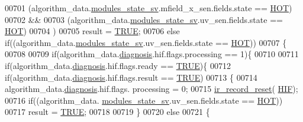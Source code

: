 \begin{DoxyCode}
{{{{{00701                         (algorithm\_data.\hyperlink{a00016_a293140e240bbd54f7601adbc9194148c}{modules\_state\_sv}.mfield\_x\_sen.fields.state == 
      \hyperlink{a00021_a1eb14cc432874ddacd1934791dbe12a3}{HOT})
00702                         &&
00703                         (algorithm\_data.\hyperlink{a00016_a293140e240bbd54f7601adbc9194148c}{modules\_state\_sv}.uv\_sen.fields.state == 
      \hyperlink{a00021_a1eb14cc432874ddacd1934791dbe12a3}{HOT})
00704                         )
00705                             result = \hyperlink{a00040_aa8cecfc5c5c054d2875c03e77b7be15d}{TRUE};
00706                        \textcolor{keywordflow}{else} \textcolor{keywordflow}{if}((algorithm\_data.\hyperlink{a00016_a293140e240bbd54f7601adbc9194148c}{modules\_state\_sv}.uv\_sen.fields.state == 
      \hyperlink{a00021_a1eb14cc432874ddacd1934791dbe12a3}{HOT}))
00707                        \{
00708 
00709                                        \textcolor{keywordflow}{if}(algorithm\_data.\hyperlink{a00016_a16f85d57ec98b4ad05f5a2e10536b3c6}{diagnosis}.hif.flags.processing == 1)\{
00710 
00711                                            \textcolor{keywordflow}{if}(algorithm\_data.\hyperlink{a00016_a16f85d57ec98b4ad05f5a2e10536b3c6}{diagnosis}.hif.flags.ready  == 
      \hyperlink{a00040_aa8cecfc5c5c054d2875c03e77b7be15d}{TRUE})\{
00712                                                 \textcolor{keywordflow}{if}(algorithm\_data.\hyperlink{a00016_a16f85d57ec98b4ad05f5a2e10536b3c6}{diagnosis}.hif.flags.result == 
      \hyperlink{a00040_aa8cecfc5c5c054d2875c03e77b7be15d}{TRUE})
00713                                                 \{
00714                                                         algorithm\_data.\hyperlink{a00016_a16f85d57ec98b4ad05f5a2e10536b3c6}{diagnosis}.hif.flags.
      processing = 0;
00715                                                         \hyperlink{a00017_a1c9872e93491d95a24ab0bc723d39a74}{ir\_record\_reset}(
      \hyperlink{a00017_aaa1c1ffe30eff38b979b1af9d4e4ef19}{HIF});
00716                                                         \textcolor{keywordflow}{if}((algorithm\_data.
      \hyperlink{a00016_a293140e240bbd54f7601adbc9194148c}{modules\_state\_sv}.uv\_sen.fields.state == \hyperlink{a00021_a1eb14cc432874ddacd1934791dbe12a3}{HOT}))
00717                                                         result = \hyperlink{a00040_aa8cecfc5c5c054d2875c03e77b7be15d}{TRUE};
00718 
00719                                                 \}
00720                                               \textcolor{keywordflow}{else}
00721                                                 \{
}}}}}
\end{DoxyCode}
